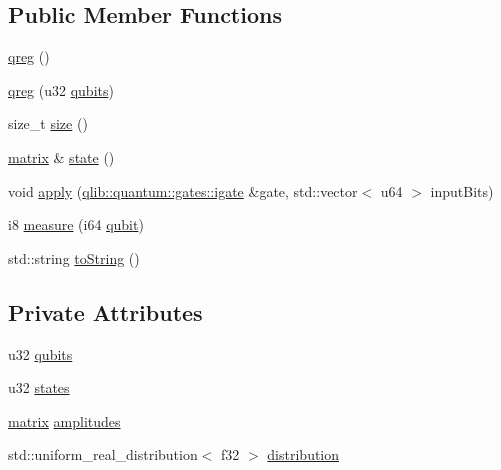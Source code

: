\subsection*{Public Member Functions}
\begin{DoxyCompactItemize}
\item 
\hyperlink{classqlib_1_1quantum_1_1qreg_aa53d83236917f0048965b487088aacb9}{qreg} ()
\item 
\hyperlink{classqlib_1_1quantum_1_1qreg_a2ddfaef9a369571c9600c4c259fcb8b1}{qreg} (u32 \hyperlink{classqlib_1_1quantum_1_1qreg_a2d7c33e71a77d860d50d53a258a71a6f}{qubits})
\item 
size\+\_\+t \hyperlink{classqlib_1_1quantum_1_1qreg_a3148742b59865d0ba04fdd327fccc048}{size} ()
\item 
\hyperlink{classqlib_1_1math_1_1matrix}{matrix} \& \hyperlink{classqlib_1_1quantum_1_1qreg_a20d1b0906eb00ff7d4e1c23449de61a1}{state} ()
\item 
void \hyperlink{classqlib_1_1quantum_1_1qreg_af38f95ecaaf7de400856094154343cfe}{apply} (\hyperlink{classqlib_1_1quantum_1_1gates_1_1igate}{qlib\+::quantum\+::gates\+::igate} \&gate, std\+::vector$<$ u64 $>$ input\+Bits)
\item 
i8 \hyperlink{classqlib_1_1quantum_1_1qreg_acfcd58502c1e511766ede52a891f27c3}{measure} (i64 \hyperlink{classqlib_1_1quantum_1_1qubit}{qubit})
\item 
std\+::string \hyperlink{classqlib_1_1quantum_1_1qreg_ae4dbf316bf6452f3110cb05146f54954}{to\+String} ()
\end{DoxyCompactItemize}
\subsection*{Private Attributes}
\begin{DoxyCompactItemize}
\item 
u32 \hyperlink{classqlib_1_1quantum_1_1qreg_a2d7c33e71a77d860d50d53a258a71a6f}{qubits}
\item 
u32 \hyperlink{classqlib_1_1quantum_1_1qreg_ad0e84b959f93f3da6ed81eb096f809d1}{states}
\item 
\hyperlink{classqlib_1_1math_1_1matrix}{matrix} \hyperlink{classqlib_1_1quantum_1_1qreg_a1a7e244ee72b78b9c5a8763efad57ada}{amplitudes}
\item 
std\+::uniform\+\_\+real\+\_\+distribution$<$ f32 $>$ \hyperlink{classqlib_1_1quantum_1_1qreg_aabd605497170f57cdbb175d21c99662e}{distribution}
\end{DoxyCompactItemize}


